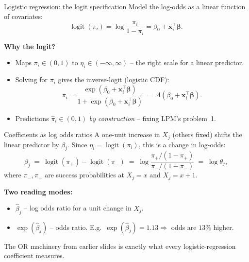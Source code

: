 \documentclass[10pt,ignorenonframetext,aspectratio=169]{beamer}
\newcommand{\bbeta}{\boldsymbol{\beta}}
\newcommand{\logit}{\operatorname{logit}}
\begin{document}
\begin{frame}{Logistic regression: the logit specification}
Model the log-odds as a linear function of covariates:
\[
\logit(\pi_i) = \log\!\frac{\pi_i}{1 - \pi_i} = \beta_0 + \mathbf{x}_i^\top\bbeta.
\]

\medskip
\textbf{Why the logit?}
\begin{itemize}
    \justifying
    \item Maps $\pi_i \in (0,1)$ to $\eta_i \in (-\infty, \infty)$ -- the right scale for a linear predictor.
    \item Solving for $\pi_i$ gives the inverse-logit (logistic CDF):
    \[
    \pi_i = \frac{\exp(\beta_0 + \mathbf{x}_i^\top\bbeta)}{1 + \exp(\beta_0 + \mathbf{x}_i^\top\bbeta)} \;=\; \Lambda(\beta_0 + \mathbf{x}_i^\top\bbeta).
    \]
    \item Predictions $\hat{\pi}_i \in (0,1)$ \emph{by construction} -- fixing LPM's problem~1.
\end{itemize}
\end{frame}


\begin{frame}{Coefficients as log odds ratios}
A one-unit increase in $X_j$ (others fixed) shifts the linear predictor by $\beta_j$. Since $\eta_i = \logit(\pi_i)$, this is a change in log-odds:
\[
\beta_j \;=\; \logit(\pi_{+}) - \logit(\pi_{-}) \;=\; \log\!\frac{\pi_+/(1-\pi_+)}{\pi_-/(1-\pi_-)} \;=\; \log\theta_j,
\]
where $\pi_-, \pi_+$ are success probabilities at $X_j = x$ and $X_j = x+1$.

\medskip
\textbf{Two reading modes:}
\begin{itemize}
    \justifying
    \item $\hat{\beta}_j$ -- log odds ratio for a unit change in $X_j$.
    \item $\exp(\hat{\beta}_j)$ -- odds ratio. E.g.\ $\exp(\hat{\beta}_j) = 1.13 \Rightarrow$ odds are $13\%$ higher.
\end{itemize}

\medskip
The OR machinery from earlier slides is exactly what every logistic-regression coefficient measures.
\end{frame}
\end{document}
